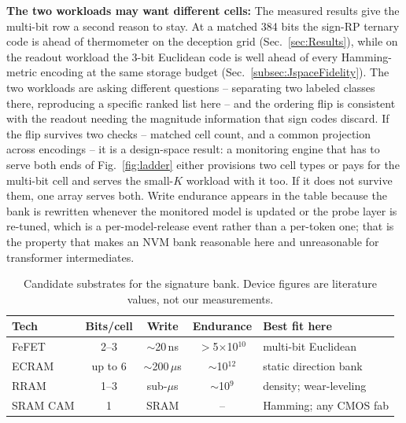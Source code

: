 \documentclass[conference]{IEEEtran}
\newcommand{\cam}{{CAM}\xspace}
\newcommand{\fefet}{{FeFET}\xspace}
\newcommand{\signrp}{{sign-RP}\xspace}
\begin{document}
\textbf{The two workloads may want different cells:} The measured
results give the multi-bit row a second reason to stay. At a matched
384 bits the \signrp ternary code is ahead of thermometer on the
deception grid (Sec.~\ref{sec:Results}), while on the readout workload
the 3-bit Euclidean code is well ahead of every Hamming-metric encoding
at the same storage budget (Sec.~\ref{subsec:JspaceFidelity}). The two
workloads are asking different questions -- separating two labeled
classes there, reproducing a specific ranked list here -- and the
ordering flip is consistent with the readout needing the magnitude
information that sign codes discard. If the flip survives two
checks -- matched cell count, and a common projection across encodings
-- it is a design-space result: a monitoring engine that has to serve both ends of
Fig.~\ref{fig:ladder} either provisions two cell types or pays for the
multi-bit cell and serves the small-$K$ workload with it too. If it
does not survive them, one array serves both. Write endurance appears in
the table because the bank is rewritten whenever the monitored model is
updated or the probe layer is re-tuned, which is a per-model-release
event rather than a per-token one; that is the property that makes an NVM
bank reasonable here and unreasonable for transformer intermediates.

\begin{table}[t]
\centering
\caption{Candidate substrates for the signature bank. Device figures are
literature values, not our measurements.}
\label{tab:devices}
{\footnotesize
\begin{tabular}{@{}lcccl@{}}
\toprule
\textbf{Tech} & \textbf{Bits/cell} & \textbf{Write} & \textbf{Endurance} &
\textbf{Best fit here} \\
\midrule
\fefet   & 2--3   & $\sim$20\,ns    & $>$5$\times$10$^{10}$ & multi-bit Euclidean \\
ECRAM    & up to 6 & $\sim$200\,$\mu$s & $\sim$10$^{12}$    & static direction bank \\
RRAM     & 1--3   & sub-$\mu$s      & $\sim$10$^{9}$        & density; wear-leveling \\
SRAM \cam & 1     & SRAM            & --                    & Hamming; any CMOS fab \\
\bottomrule
\end{tabular}}
\end{table}
\end{document}
